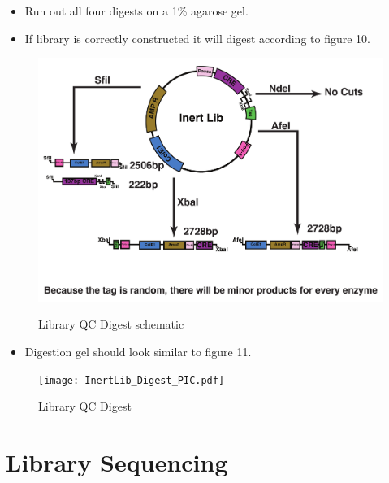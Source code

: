 \documentclass[a4paper]{article}
\begin{document}
        \begin{itemize}
                	
            \item Run out all four digests on a 1\% agarose gel.
        	
            \item If library is correctly constructed it will digest according to figure 10.
            
    	\end{itemize}
        
		\begin{figure}[H]
			\centering
			\includegraphics[width=1.0\textwidth]{Inert_Lib_Digest.pdf}
			\label{fig:InertLib_Digest}
			\caption{Library QC Digest schematic}
        \end{figure}
        
        \begin{itemize}
        
        \item Digestion gel should look similar to figure 11.
        
        \end{itemize}
        
        \begin{figure}[H]
			\centering
			\texttt{[image: InertLib\_Digest\_PIC.pdf]}
			\label{fig:InertLib_DigestGel}
			\caption{Library QC Digest}
        \end{figure}
        
\section{Library Sequencing}
\end{document}
